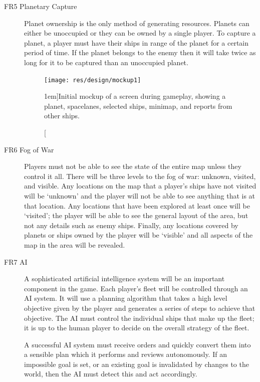 \begin{description}
	\item[FR5 Planetary Capture] Planet ownership is the only method of generating resources. Planets can either be unoccupied or they can be owned by a single player. 
	To capture a planet, a player must have their ships in range
	of the planet for a certain period of time. If the planet belongs to the enemy then it will
	take twice as long for it to be captured than an unoccupied planet.


\begin{figure}[t!]
	\texttt{[image: res/design/mockup1]}
	\caption[Initial mockup of a screen during gameplay][1em]{Initial mockup of a screen during gameplay, showing a planet, spacelanes, selected ships, minimap, and reports from other ships.}
	\label{fig:mockup1}
\end{figure}

	\item[FR6 Fog of War] Players must not be able to see the state of the entire map unless they control it all. There
	will be three levels to the fog of war: unknown, visited, and visible. Any locations on the map
	that a player's ships have not visited will be `unknown' and the player will not be able to see
	anything that is at that location. Any locations that have been explored at least once will be
	`visited'; the player will be able to see the general layout of the area, but not any details
	such as enemy ships. Finally, any locations covered by planets or ships owned by the player will
	be `visible' and all aspects of the map in the area will be revealed.
	
	\item[FR7 AI] A sophisticated artificial intelligence system will be an important component in the game.
	Each player's fleet will be controlled through an AI system. It will use a planning algorithm
	that takes a high level objective given by the player and generates a series of steps to
	achieve that objective. The AI must control the individual ships that make up the fleet; it
	is up to the human player to decide on the overall strategy of the fleet.

	A successful AI system must receive orders and quickly convert them into a sensible plan which it performs and reviews autonomously. If an impossible goal is set, or an existing goal is
	invalidated by changes to the world, then the AI must detect this and act accordingly.



\end{description}
